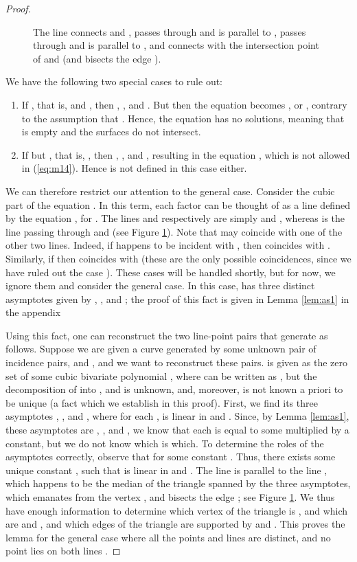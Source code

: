 \documentclass[12pt]{article}
\begin{document}
\begin{proof}
\begin{figure}[htb]
\begin{center}
{	The line 
	connects  and ,  passes through  and is
	parallel to ,  passes through  and is
	parallel to , and  connects
	 with the intersection point  of
	 and  (and bisects the edge ).
}
\label{fig:lines}
\end{center}
\end{figure}
We have the following two special cases to rule out:
\begin{enumerate}
\item If , that is,  and , then
	  , , and . But then the equation
	  becomes , or , contrary to the
	  assumption that . Hence, the
	  equation has no solutions, meaning that 
	  is empty and the surfaces do not intersect.
\item If  but , that is,
	  , then
	  , , and ,
	  resulting in the equation , which is not allowed in
	  (\ref{eq:m14}). Hence  is not defined in this case either.
\end{enumerate}
We can therefore restrict our attention to the general case.
Consider the cubic part of the equation . In this term,
each factor can be thought of as a line defined by the equation
, for . The lines  and  respectively
are simply  and , whereas  is
the line  passing through  and  (see Figure
\ref{fig:lines}). Note that  may coincide with one of the
other two lines.
Indeed, if  happens to be incident with , then 
coincides with . Similarly, if  then 
coincides with  (these are the only possible coincidences,
since we have ruled out the case ).
These cases will be handled shortly, but for now, we ignore them and
consider the general
case. In this case,  has three distinct asymptotes given by
, , and ; the proof of this fact is given in Lemma
\ref{lem:as1} in the appendix

Using this fact, one can reconstruct the two line-point pairs that
generate  as follows.
Suppose we are given a curve  generated by some unknown
pair of incidence pairs,  and , and
we want to reconstruct these pairs.
 is given as the zero set of some cubic bivariate polynomial
, where  can be written as , but the decomposition of 
into , and  is unknown, and, moreover,
is not known a priori to be unique (a fact which we establish in this
proof).
First, we find its three asymptotes , ,
and , where for each ,
 is linear in  and .
Since, by Lemma \ref{lem:as1}, these asymptotes are , ,
and , we know that each  is equal to some 
multiplied by a constant, but we do not know which is which.
To determine the roles of the asymptotes correctly, observe that
 for some constant
. Thus, there exists some unique constant , such that
 is linear in
 and . The line  is parallel to the line ,
which happens to be the median of the triangle spanned by the three
asymptotes, which emanates from the vertex , and
bisects the edge ; see Figure \ref{fig:lines}.
We thus have enough information to determine which vertex of the
triangle is , and which are  and , and which edges of the
triangle are supported by  and .
This proves the lemma for the general case where all the points
and lines are distinct, and no point lies on both lines .


\end{proof}
\end{document}

